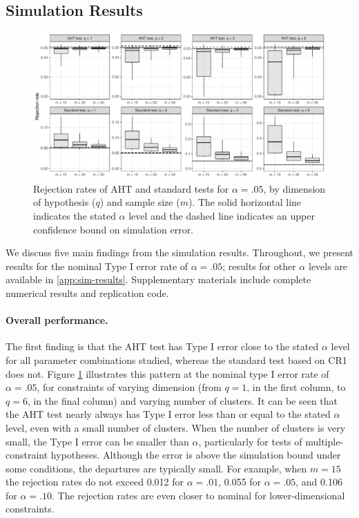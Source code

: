 \documentclass[12pt]{article}
\begin{document}
\hypertarget{simulation-results}{%
\subsection{Simulation Results}\label{simulation-results}}

\begin{figure}

{\centering \includegraphics[width=\linewidth]{CR_fig/overview-1} 

}

\caption{Rejection rates of AHT and standard tests for $\alpha = .05$, by dimension of hypothesis ($q$) and sample size ($m$). The solid horizontal line indicates the stated $\alpha$ level and the dashed line indicates an upper confidence bound on simulation error.}\label{fig:overview}
\end{figure}

We discuss five main findings from the simulation results. Throughout,
we present results for the nominal Type I error rate of
\(\alpha = .05\); results for other \(\alpha\) levels are available in
\ref{app:sim-results}. Supplementary materials include complete
numerical results and replication code.

\hypertarget{overall-performance.}{%
\paragraph{Overall performance.}\label{overall-performance.}}

The first finding is that the AHT test has Type I error close to the
stated \(\alpha\) level for all parameter combinations studied, whereas
the standard test based on CR1 does not. Figure \ref{fig:overview}
illustrates this pattern at the nominal type I error rate of
\(\alpha = .05\), for constraints of varying dimension (from \(q = 1\),
in the first column, to \(q = 6\), in the final column) and varying
number of clusters. It can be seen that the AHT test nearly always has
Type I error less than or equal to the stated \(\alpha\) level, even
with a small number of clusters. When the number of clusters is very
small, the Type I error can be smaller than \(\alpha\), particularly for
tests of multiple-constraint hypotheses. Although the error is above the
simulation bound under some conditions, the departures are typically
small. For example, when \(m = 15\) the rejection rates do not exceed
0.012 for \(\alpha = .01\), 0.055 for \(\alpha = .05\), and 0.106 for
\(\alpha = .10\). The rejection rates are even closer to nominal for
lower-dimensional constraints.
\end{document}
